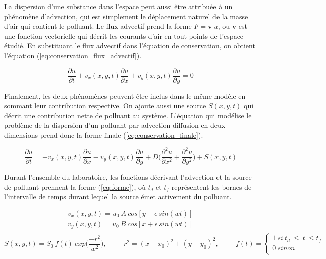 \documentclass{article}
\begin{document}
La dispersion d'une substance dans l'espace peut aussi être attribuée à un phénomène d'advection, qui est simplement le déplacement naturel de la masse d'air qui contient le polluant. Le flux advectif prend la forme $F = \textbf{v} \ u$, ou $\textbf{v}$ est une fonction vectorielle qui décrit les courants d'air en tout points de l'espace étudié. En substituant le flux advectif dans l'équation de conservation, on obtient l'équation (\ref{eq:conservation_flux_advectif}).

\begin{equation}\label{eq:conservation_flux_advectif}
\frac{\partial u}{\partial t} + v_x (x,y,t) \frac{\partial u}{\partial x} + v_y (x,y,t) \frac{\partial u}{\partial y} = 0
\end{equation}

Finalement, les deux phénomènes peuvent être inclus dans le même modèle en sommant leur contribution respective. On ajoute aussi une source $S(x, y, t)$ qui décrit une contribution nette de polluant au système. L'équation qui modélise le problème de la dispersion d'un polluant par advection-diffusion en deux dimensions prend donc la forme finale (\ref{eq:conservation_finale}).

\begin{equation}\label{eq:conservation_finale}
\frac{\partial u}{\partial t} =  - v_x(x,y,t) \frac{\partial u}{\partial x} - v_y(x,y,t) \frac{\partial u}{\partial y} + D \Big(\frac{\partial^2 u}{\partial x^2} + \frac{\partial^2 u}{\partial y^2}\Big) + S(x,y,t)
\end{equation}

Durant l'ensemble du laboratoire, les fonctions décrivant l'advection et la source de polluant prennent la forme  (\ref{eq:forme}), où $t_d$ et $t_f$ représentent les bornes de l'intervalle de temps durant lequel la source émet activement du polluant.

\begin{equation} \label{eq:forme}
\begin{gathered}
v_x(x,y,t) = u_0\ A\ cos[y + \epsilon \ sin(wt)]\\
v_y(x,y,t) = u_0\ B\ cos[x + \epsilon \ sin(wt)]\\
\end{gathered}
\end{equation}
\begin{equation*}
S(x,y,t) = S_0 \ f(t) \ exp\big(\frac{-r^2}{w^2}\big), 
\hspace{1cm} r^2 = (x-x_0)^2 + (y-y_0)^2,
\hspace{1cm} f(t) = \begin{cases}
	1\ si\ t_d\ \leq \ t\ \leq t_f\ \\
	0\ sinon\\
\end{cases}
\end{equation*}
\end{document}
